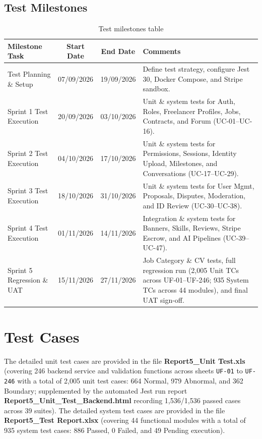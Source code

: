 \documentclass[12pt,a4paper]{article}
\newcommand{\hd}[1]{\textbf{#1}}
\begin{document}
\subsection{Test Milestones}

\begin{table}[H]
\caption{Test milestones table}
\begin{tabularx}{\textwidth}{|L{4.0cm}|c|c|Y|}
\hline
{}\hd{Milestone Task} & \hd{Start Date} & \hd{End Date} & \hd{Comments} \\ \hline
Test Planning \& Setup & 07/09/2026 & 19/09/2026 & Define test strategy, configure Jest 30, Docker Compose, and Stripe sandbox. \\ \hline
Sprint 1 Test Execution & 20/09/2026 & 03/10/2026 & Unit \& system tests for Auth, Roles, Freelancer Profiles, Jobs, Contracts, and Forum (UC-01--UC-16). \\ \hline
Sprint 2 Test Execution & 04/10/2026 & 17/10/2026 & Unit \& system tests for Permissions, Sessions, Identity Upload, Milestones, and Conversations (UC-17--UC-29). \\ \hline
Sprint 3 Test Execution & 18/10/2026 & 31/10/2026 & Unit \& system tests for User Mgmt, Proposals, Disputes, Moderation, and ID Review (UC-30--UC-38). \\ \hline
Sprint 4 Test Execution & 01/11/2026 & 14/11/2026 & Integration \& system tests for Banners, Skills, Reviews, Stripe Escrow, and AI Pipelines (UC-39--UC-47). \\ \hline
Sprint 5 Regression \& UAT & 15/11/2026 & 27/11/2026 & Job Category \& CV tests, full regression run (2,005 Unit TCs across UF-01--UF-246; 935 System TCs across 44 modules), and final UAT sign-off. \\ \hline
\end{tabularx}
\end{table}

\section{Test Cases}

The detailed unit test cases are provided in the file \textbf{Report5\_Unit Test.xls} (covering 246 backend service and validation functions across sheets \texttt{UF-01} to \texttt{UF-246} with a total of 2,005 unit test cases: 664 Normal, 979 Abnormal, and 362 Boundary; supplemented by the automated Jest run report \textbf{Report5\_Unit\_Test\_Backend.html} recording 1,536/1,536 passed cases across 39 suites). The detailed system test cases are provided in the file \textbf{Report5\_Test Report.xlsx} (covering 44 functional modules with a total of 935 system test cases: 886 Passed, 0 Failed, and 49 Pending execution).
\end{document}
